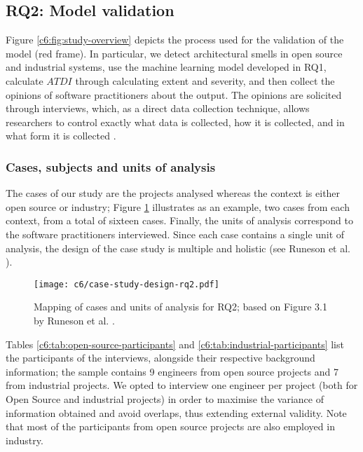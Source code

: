\subsection{RQ2: Model validation}\label{c6:sec:rq2-methodology}
Figure \ref{c6:fig:study-overview} depicts the process used for the validation of the model (red frame).
In particular, we detect architectural smells in open source and industrial systems, use the machine learning model developed in RQ1, calculate $ATDI$ through calculating extent and severity, and then collect the opinions of software practitioners about the output. 
The opinions are solicited through interviews, which, as a direct data collection technique, allows researchers to control exactly what data is collected, how it is collected, and in what form it is collected \cite{Runeson2012,Lethbridge2005}. 

\subsubsection{Cases, subjects and units of analysis}
The cases of our study are the projects analysed whereas the context is either open source or industry; Figure \ref{c6:fig:case-study-design-rq2} illustrates as an example, two cases from each context, from a total of sixteen cases. 
Finally, the units of analysis correspond to the software practitioners interviewed. Since each case contains a single unit of analysis, the design of the case study is multiple and holistic (see Runeson et al. \cite{Runeson2012}).

\begin{figure}
    \centering
    \texttt{[image: c6/case-study-design-rq2.pdf]}
    \caption{Mapping of cases and units of analysis for RQ2; based on Figure 3.1 by Runeson et al. \cite{Runeson2012}.}\label{c6:fig:case-study-design-rq2}
\end{figure}

Tables \ref{c6:tab:open-source-participants} and \ref{c6:tab:industrial-participants} list the participants of the interviews, alongside their respective background information; the sample contains 9 engineers from open source projects and 7 from industrial projects.
We opted to interview one engineer per project (both for Open Source and  industrial projects) in order to maximise the variance of information obtained and avoid overlaps, thus extending external validity.
Note that most of the participants from open source projects are also employed in industry.

